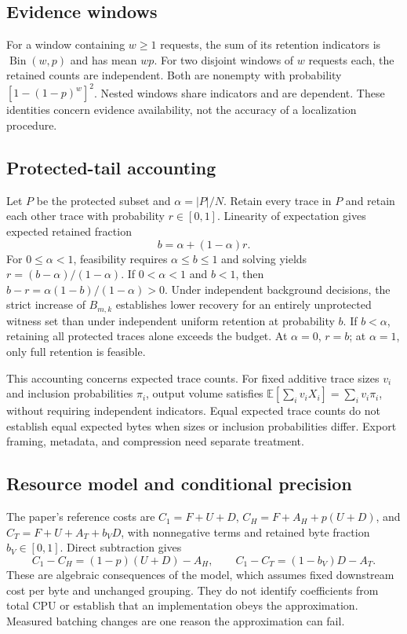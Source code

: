 \subsection{Evidence windows}
For a window containing $w\ge1$ requests, the sum of its retention indicators is $\operatorname{Bin}(w,p)$ and has mean $wp$. For two disjoint windows of $w$ requests each, the retained counts are independent. Both are nonempty with probability $[1-(1-p)^w]^2$. Nested windows share indicators and are dependent. These identities concern evidence availability, not the accuracy of a localization procedure.

\subsection{Protected-tail accounting}
Let $P$ be the protected subset and $\alpha=|P|/N$. Retain every trace in $P$ and retain each other trace with probability $r\in[0,1]$. Linearity of expectation gives expected retained fraction
\[
b=\alpha+(1-\alpha)r.
\]
For $0\le\alpha<1$, feasibility requires $\alpha\le b\le1$ and solving yields $r=(b-\alpha)/(1-\alpha)$. If $0<\alpha<1$ and $b<1$, then $b-r=\alpha(1-b)/(1-\alpha)>0$. Under independent background decisions, the strict increase of $B_{m,k}$ establishes lower recovery for an entirely unprotected witness set than under independent uniform retention at probability $b$. If $b<\alpha$, retaining all protected traces alone exceeds the budget. At $\alpha=0$, $r=b$; at $\alpha=1$, only full retention is feasible.

This accounting concerns expected trace counts. For fixed additive trace sizes $v_i$ and inclusion probabilities $\pi_i$, output volume satisfies $\mathbb E[\sum_i v_iX_i]=\sum_i v_i\pi_i$, without requiring independent indicators. Equal expected trace counts do not establish equal expected bytes when sizes or inclusion probabilities differ. Export framing, metadata, and compression need separate treatment.

\subsection{Resource model and conditional precision}
The paper's reference costs are $C_1=F+U+D$, $C_H=F+A_H+p(U+D)$, and $C_T=F+U+A_T+b_VD$, with nonnegative terms and retained byte fraction $b_V\in[0,1]$. Direct subtraction gives
\[
C_1-C_H=(1-p)(U+D)-A_H,\qquad
C_1-C_T=(1-b_V)D-A_T.
\]
These are algebraic consequences of the model, which assumes fixed downstream cost per byte and unchanged grouping. They do not identify coefficients from total CPU or establish that an implementation obeys the approximation. Measured batching changes are one reason the approximation can fail.

